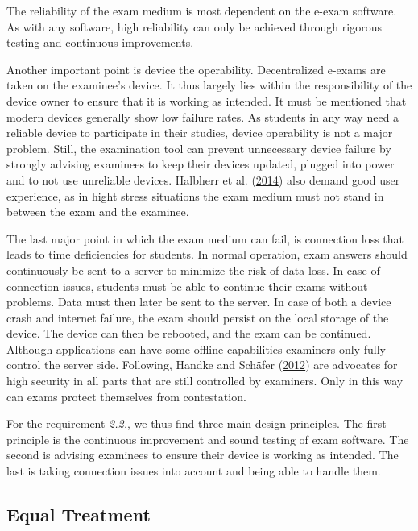 The reliability of the exam medium is most dependent on the e-exam
software. As with any software, high reliability can only be achieved
through rigorous testing and continuous improvements.

Another important point is device the operability. Decentralized e-exams
are taken on the examinee's device. It thus largely lies within the
responsibility of the device owner to ensure that it is working as
intended. It must be mentioned that modern devices generally show low
failure rates. As students in any way need a reliable device to
participate in their studies, device operability is not a major problem.
Still, the examination tool can prevent unnecessary device failure by
strongly advising examinees to keep their devices updated, plugged into
power and to not use unreliable devices. Halbherr et al.
(\protect\hyperlink{ref-Halbherr2014}{2014}) also demand good user
experience, as in hight stress situations the exam medium must not stand
in between the exam and the examinee.

The last major point in which the exam medium can fail, is connection
loss that leads to time deficiencies for students. In normal operation,
exam answers should continuously be sent to a server to minimize the
risk of data loss. In case of connection issues, students must be able
to continue their exams without problems. Data must then later be sent
to the server. In case of both a device crash and internet failure, the
exam should persist on the local storage of the device. The device can
then be rebooted, and the exam can be continued. Although applications
can have some offline capabilities examiners only fully control the
server side. Following, Handke and Schäfer
(\protect\hyperlink{ref-Handke2012}{2012}) are advocates for high
security in all parts that are still controlled by examiners. Only in
this way can exams protect themselves from contestation.

For the requirement \emph{2.2.}, we thus find three main design
principles. The first principle is the continuous improvement and sound
testing of exam software. The second is advising examinees to ensure
their device is working as intended. The last is taking connection
issues into account and being able to handle them.

\hypertarget{equal-treatment}{%
\subsection{Equal Treatment}\label{equal-treatment}}

